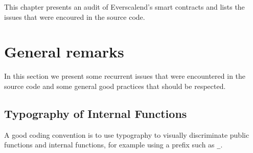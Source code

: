 


\noindent This chapter presents an audit of Everscalend's smart contracts and lists the issues that were encoured in the source code.


\begin{figure}[hbt!]

\listoffigures
\end{figure}




\section{General remarks}

In this section we present some recurrent issues that were encountered in the source code and some general good practices that should be respected. 





\subsection{Typography of Internal Functions}
\label{readability:internal}

A good coding convention is to use typography to visually discriminate public functions and internal functions, for example using a prefix such as {\tt \_}.



